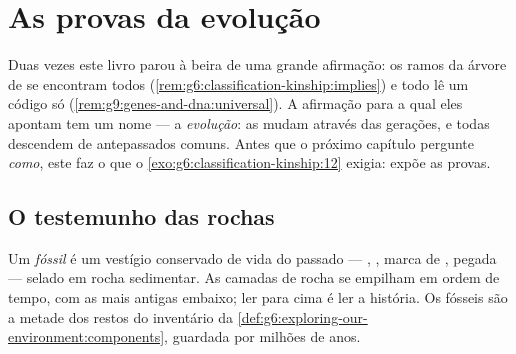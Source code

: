 \chapter{As provas da evolução}\label{ch:g9:evidence-of-evolution}

Duas vezes este livro parou à beira de uma grande afirmação:
os ramos da árvore de  se encontram todos
(\cref{rem:g6:classification-kinship:implies}) e todo  lê um código só
(\cref{rem:g9:genes-and-dna:universal}). A afirmação para a
qual eles apontam tem um nome --- a \emph{evolução}: as
 mudam através das gerações, e todas descendem de
antepassados comuns. Antes que o próximo capítulo pergunte
\emph{como}, este faz o que o
\cref{exo:g6:classification-kinship:12} exigia: expõe as
provas.

\section{O testemunho das rochas}

\begin{definition}[Os fósseis]\label{def:g9:evidence-of-evolution:fossils}
Um \emph{fóssil} é um vestígio conservado de
vida do passado --- , , marca de , pegada ---
selado em rocha sedimentar. As camadas de rocha se empilham
em ordem de tempo, com as mais antigas embaixo; ler para cima
é ler a história. Os fósseis são a metade dos restos do
inventário da
\cref{def:g6:exploring-our-environment:components}, guardada
por milhões de anos.
\end{definition}

